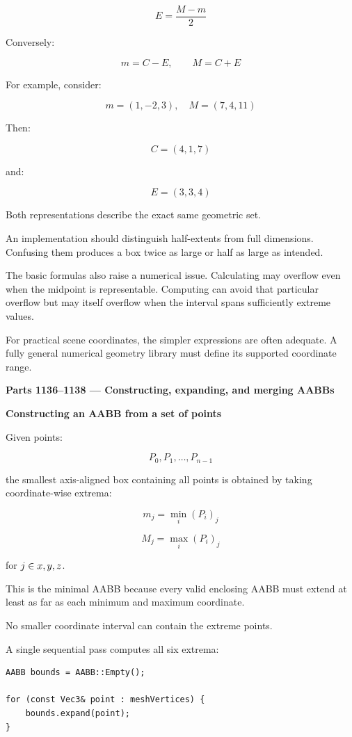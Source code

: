 \[
\boxed{E=\frac{M-m}{2}}
\]

Conversely:

\[
\boxed{m=C-E,\qquad M=C+E}
\]

For example, consider:

\[
m=(1,-2,3),\quad M=(7,4,11)
\]

Then:

\[
C=(4,1,7)
\]

and:

\[
E=(3,3,4)
\]

Both representations describe the exact same geometric set.

An implementation should distinguish half-extents from full dimensions. Confusing them produces a box twice as large or half as large as intended.

The basic formulas also raise a numerical issue. Calculating  may overflow even when the midpoint is representable. Computing  can avoid that particular overflow but may itself overflow when the interval spans sufficiently extreme values.

For practical scene coordinates, the simpler expressions are often adequate. A fully general numerical geometry library must define its supported coordinate range.

\textbf{Parts 1136--1138 --- Constructing, expanding, and merging AABBs}

\textbf{Constructing an AABB from a set of points}

Given points:

\[
P_0,P_1,\ldots,P_{n-1}
\]

the smallest axis-aligned box containing all points is obtained by taking coordinate-wise extrema:

\[
\boxed{ m_j=\min_i(P_i)_j }
\]

\[
\boxed{ M_j=\max_i(P_i)_j }
\]

for \(j\in\\{x,y,z\\}\).

This is the minimal AABB because every valid enclosing AABB must extend at least as far as each minimum and maximum coordinate.

No smaller coordinate interval can contain the extreme points.

A single sequential pass computes all six extrema:

\begin{verbatim}
AABB bounds = AABB::Empty();

for (const Vec3& point : meshVertices) {
    bounds.expand(point);
}
\end{verbatim}

